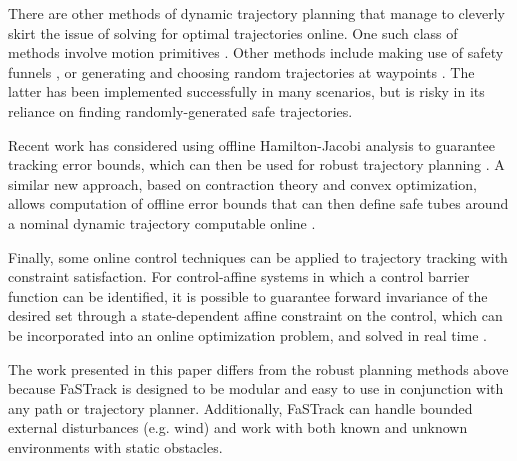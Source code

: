 There are other methods of dynamic trajectory planning that manage to cleverly skirt the issue of solving for optimal trajectories online.  One such class of methods involve motion primitives \cite{Gillula2010, Dey2016}. Other methods include making use of safety funnels \cite{Majumdar2016}, or generating and choosing random trajectories at waypoints \cite{Kalakrishnan2011, Schwesinger2013}. The latter has been implemented successfully in many scenarios, but is risky in its reliance on finding randomly-generated safe trajectories. 

Recent work has considered using offline Hamilton-Jacobi analysis to guarantee tracking error bounds, which can then be used for robust trajectory planning \cite{Bansal2017}. A similar new approach, based on contraction theory and convex optimization, allows computation of offline error bounds that can then define safe tubes around a nominal dynamic trajectory computable online \cite{Singh2017}.

Finally, some online control techniques can be applied to trajectory tracking with constraint satisfaction. For control-affine systems in which a control barrier function can be identified, it is possible to guarantee forward invariance of the desired set through a state-dependent affine constraint on the control, which can be incorporated into an online optimization problem, and solved in real time \cite{Ames2014}. %

The work presented in this paper differs from the robust planning methods above because FaSTrack is designed to be modular and easy to use in conjunction with any path or trajectory planner. Additionally, FaSTrack can handle bounded external disturbances (e.g. wind) and work with both known and unknown environments with static obstacles.